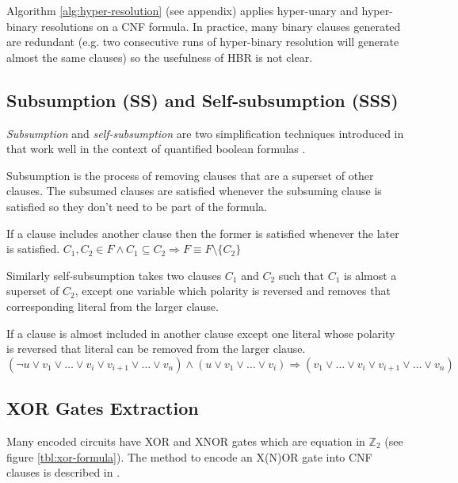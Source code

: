 Algorithm \ref{alg:hyper-resolution} (see appendix)
applies hyper-unary and hyper-binary resolutions on a CNF formula. In
practice, many binary clauses generated are redundant (e.g. two
consecutive runs of hyper-binary resolution will generate almost
the same clauses) so the usefulness of HBR is not clear.


\subsection{Subsumption (SS) and Self-subsumption (SSS)}
\label{ssec:sss}

\emph{Subsumption} and \emph{self-subsumption} are two simplification
techniques introduced in \cite{Een05effectivepreprocessing}
that work well in the context of quantified boolean formulas
\cite{Biere04resolveand}.

Subsumption is the process of removing clauses that are a superset
of other clauses. The subsumed clauses are satisfied whenever
the subsuming clause is satisfied so they don't need to be part of
the formula.

\begin{myprop}[Subsumption]
  If a clause includes another clause then the former is satisfied whenever the
  later is satisfied.
  $C_1, C_2 \in F \land C_1 \subseteq C_2 \Rightarrow F \equiv F \setminus \{
  C_2 \}$
\end{myprop}

Similarly self-subsumption takes two clauses $C_1$ and $C_2$ such
that $C_1$ is almost a superset of $C_2$, except one variable which
polarity is reversed and removes that corresponding literal from
the larger clause.

\begin{myprop}
  If a clause is almost included in another clause except one literal whose
  polarity is reversed that literal can be removed from the larger clause.
  $(\neg u \lor v_1 \lor \ldots \lor v_i \lor v_{i+1} \lor \ldots \lor v_n)
    \land (u \lor v_1 \lor \ldots \lor v_i)
    \Rightarrow (v_1 \lor \ldots \lor v_i \lor v_{i+1} \lor \ldots \lor v_n)$
\end{myprop}


\subsection{XOR Gates Extraction}
\label{ssec:xor-extraction}

Many encoded circuits have XOR and XNOR gates which are equation
in $\mathbb{Z}_2$ (see figure \ref{tbl:xor-formula}). The method
to encode an X(N)OR gate into CNF clauses is described in
\cite{Roy_restoringcircuit}.


